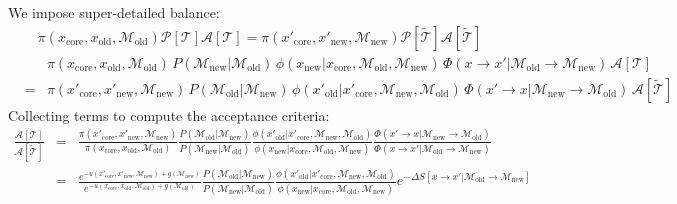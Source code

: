 \documentclass[aps,pre,twocolumn,nofootinbib,superscriptaddress,linenumbers,11point]{revtex4-1}
\begin{document}
\begin{widetext}
We impose super-detailed balance:
\begin{eqnarray}
\pi(x_\mathrm{core}, x_\mathrm{old}, \mathcal{M}_\mathrm{old}) \mathcal{P}[\mathcal{T}] \mathcal{A}[\mathcal{T}] = \pi(x'_\mathrm{core}, x'_\mathrm{new}, \mathcal{M}_\mathrm{new}) \mathcal{P}[\tilde{\mathcal{T}}] \mathcal{A}[\tilde{\mathcal{T}}]
\end{eqnarray}
\begin{eqnarray}
&& \pi(x_\mathrm{core}, x_\mathrm{old}, \mathcal{M}_\mathrm{old}) \, P(\mathcal{M}_\mathrm{new} | \mathcal{M}_\mathrm{old}) \, \phi(x_\mathrm{new} | x_\mathrm{core}, \mathcal{M}_\mathrm{old}, \mathcal{M}_\mathrm{new}) \, \Phi(x \rightarrow x' | \mathcal{M}_\mathrm{old} \rightarrow \mathcal{M}_\mathrm{new}) \, \mathcal{A}[\mathcal{T}] \nonumber \\
&=& \pi(x'_\mathrm{core}, x'_\mathrm{new}, \mathcal{M}_\mathrm{new}) \, P(\mathcal{M}_\mathrm{old} | \mathcal{M}_\mathrm{new}) \, \phi(x'_\mathrm{old} | x'_\mathrm{core}, \mathcal{M}_\mathrm{new}, \mathcal{M}_\mathrm{old}) \, \Phi(x' \rightarrow x | \mathcal{M}_\mathrm{new} \rightarrow \mathcal{M}_\mathrm{old}) \, \mathcal{A}[\tilde{\mathcal{T}}]
\end{eqnarray}
Collecting terms to compute the acceptance criteria:
\begin{eqnarray}
\frac{\mathcal{A}[\mathcal{T}]}{\mathcal{A}[\tilde{\mathcal{T}}]} &=& \frac{\pi(x'_\mathrm{core}, x'_\mathrm{new}, \mathcal{M}_\mathrm{new})}{\pi(x_\mathrm{core}, x_\mathrm{old}, \mathcal{M}_\mathrm{old})} \frac{P(\mathcal{M}_\mathrm{old} | \mathcal{M}_\mathrm{new})}{P(\mathcal{M}_\mathrm{new} | \mathcal{M}_\mathrm{old})} \frac{\phi(x'_\mathrm{old} | x'_\mathrm{core}, \mathcal{M}_\mathrm{new}, \mathcal{M}_\mathrm{old})}{\phi(x_\mathrm{new} | x_\mathrm{core}, \mathcal{M}_\mathrm{old}, \mathcal{M}_\mathrm{new})} \frac{\Phi(x' \rightarrow x | \mathcal{M}_\mathrm{new} \rightarrow \mathcal{M}_\mathrm{old})}{\Phi(x \rightarrow x' | \mathcal{M}_\mathrm{old} \rightarrow \mathcal{M}_\mathrm{new})} \\
&=& \frac{e^{-u(x'_\mathrm{core}, x'_\mathrm{new}, \mathcal{M}_\mathrm{new}) + g(\mathcal{M}_\mathrm{new})}}{e^{-u(x_\mathrm{core}, x_\mathrm{old}, \mathcal{M}_\mathrm{old}) + g(\mathcal{M}_\mathrm{old})}} \frac{P(\mathcal{M}_\mathrm{old} | \mathcal{M}_\mathrm{new})}{P(\mathcal{M}_\mathrm{new} | \mathcal{M}_\mathrm{old})} \frac{\phi(x'_\mathrm{old} | x'_\mathrm{core}, \mathcal{M}_\mathrm{new}, \mathcal{M}_\mathrm{old})}{\phi(x_\mathrm{new} | x_\mathrm{core}, \mathcal{M}_\mathrm{old}, \mathcal{M}_\mathrm{new})} e^{-\Delta S[x \rightarrow x' | \mathcal{M}_\mathrm{old} \rightarrow \mathcal{M}_\mathrm{new}]} \\

\end{eqnarray}
\end{widetext}
\end{document}
